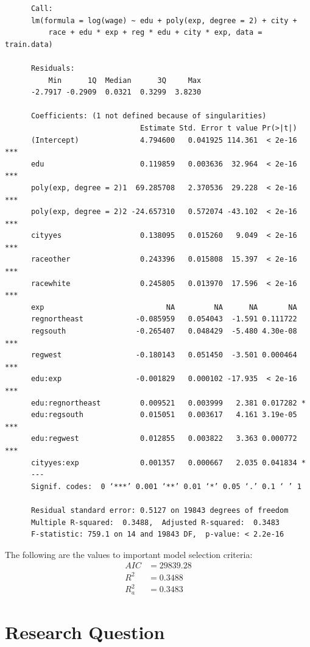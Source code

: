 \documentclass{article}
\begin{document}
    \begin{verbatim}
      Call:
      lm(formula = log(wage) ~ edu + poly(exp, degree = 2) + city +
          race + edu * exp + reg * edu + city * exp, data = train.data)

      Residuals:
          Min      1Q  Median      3Q     Max
      -2.7917 -0.2909  0.0321  0.3299  3.8230

      Coefficients: (1 not defined because of singularities)
                               Estimate Std. Error t value Pr(>|t|)
      (Intercept)              4.794600   0.041925 114.361  < 2e-16 ***
      edu                      0.119859   0.003636  32.964  < 2e-16 ***
      poly(exp, degree = 2)1  69.285708   2.370536  29.228  < 2e-16 ***
      poly(exp, degree = 2)2 -24.657310   0.572074 -43.102  < 2e-16 ***
      cityyes                  0.138095   0.015260   9.049  < 2e-16 ***
      raceother                0.243396   0.015808  15.397  < 2e-16 ***
      racewhite                0.245805   0.013970  17.596  < 2e-16 ***
      exp                            NA         NA      NA       NA
      regnortheast            -0.085959   0.054043  -1.591 0.111722
      regsouth                -0.265407   0.048429  -5.480 4.30e-08 ***
      regwest                 -0.180143   0.051450  -3.501 0.000464 ***
      edu:exp                 -0.001829   0.000102 -17.935  < 2e-16 ***
      edu:regnortheast         0.009521   0.003999   2.381 0.017282 *
      edu:regsouth             0.015051   0.003617   4.161 3.19e-05 ***
      edu:regwest              0.012855   0.003822   3.363 0.000772 ***
      cityyes:exp              0.001357   0.000667   2.035 0.041834 *
      ---
      Signif. codes:  0 ‘***’ 0.001 ‘**’ 0.01 ‘*’ 0.05 ‘.’ 0.1 ‘ ’ 1

      Residual standard error: 0.5127 on 19843 degrees of freedom
      Multiple R-squared:  0.3488,	Adjusted R-squared:  0.3483
      F-statistic: 759.1 on 14 and 19843 DF,  p-value: < 2.2e-16
    \end{verbatim}

    The following are the values to important model selection criteria:
    \begin{align*}
      AIC &= 29839.28 \\
      R^2 &= 0.3488 \\
      R_a^2 &= 0.3483
    \end{align*}

  \section{Research Question}
\end{document}
